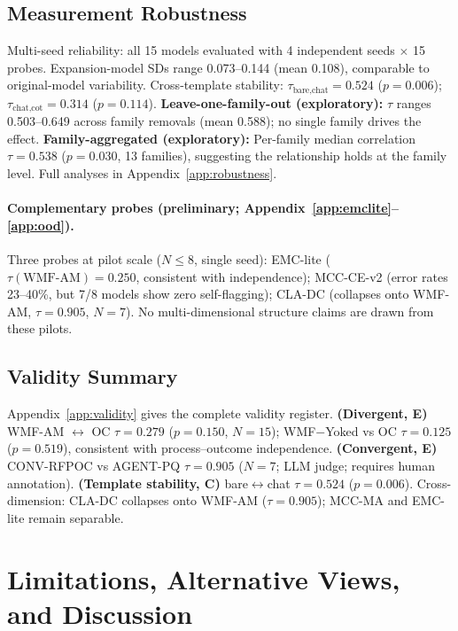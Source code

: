 \documentclass{article}
\begin{document}
\subsection{Measurement Robustness}
\label{sec:meas_robustness}

Multi-seed reliability: all 15 models evaluated with 4 independent seeds
$\times$ 15 probes. Expansion-model SDs range 0.073--0.144 (mean 0.108),
comparable to original-model variability. Cross-template stability:
$\tau_{\text{bare,chat}} = 0.524$ ($p = 0.006$); $\tau_{\text{chat,cot}}
= 0.314$ ($p = 0.114$).
\textbf{Leave-one-family-out (exploratory):}
$\tau$ ranges 0.503--0.649 across family removals (mean 0.588); no
single family drives the effect.
\textbf{Family-aggregated (exploratory):}
Per-family median correlation $\tau = 0.538$ ($p = 0.030$, 13 families),
suggesting the relationship holds at the family level.
Full analyses in Appendix~\ref{app:robustness}.

\paragraph{Complementary probes (preliminary; Appendix~\ref{app:emclite}--\ref{app:ood}).}
Three probes at pilot scale ($N{\leq}8$, single seed):
EMC-lite ($\tau(\text{WMF-AM}){=}0.250$, consistent with independence);
MCC-CE-v2 (error rates 23--40\%, but 7/8 models show zero self-flagging);
CLA-DC (collapses onto WMF-AM, $\tau{=}0.905$, $N{=}7$).
No multi-dimensional structure claims are drawn from these pilots.

\subsection{Validity Summary}
\label{sec:validity}

Appendix~\ref{app:validity} gives the complete validity register.
\textbf{(Divergent, E)} WMF-AM $\leftrightarrow$ OC
$\tau{=}0.279$ ($p{=}0.150$, $N{=}15$); WMF$-$Yoked vs OC
$\tau{=}0.125$ ($p{=}0.519$), consistent with process--outcome independence.
\textbf{(Convergent, E)} CONV-RFPOC vs AGENT-PQ
$\tau{=}0.905$ ($N{=}7$; LLM judge; requires human annotation).
\textbf{(Template stability, C)} bare$\leftrightarrow$chat $\tau{=}0.524$
($p{=}0.006$).
Cross-dimension: CLA-DC collapses onto WMF-AM ($\tau{=}0.905$);
MCC-MA and EMC-lite remain separable.

\section{Limitations, Alternative Views, and Discussion}
\label{sec:discussion}
\end{document}
